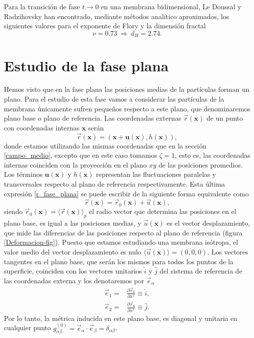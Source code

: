 Para la transición de fase $t\rightarrow 0$ en una membrana bidimensional,
Le Doussal y Radzihovsky \cite{Doussal:nu} han encontrado, mediante métodos analítico aproximados,
los siguientes valores para el exponente de Flory y la dimensión fractal 
\begin{equation*} 
 \nu=0.73\ \Rightarrow\ d_H=2.74 .
\end{equation*}

\section{Estudio de la fase plana}

Hemos visto que en la fase plana las posiciones medias de la partículas forman
un plano. Para el estudio de esta fase vamos a considerar las partículas de la
membrana únicamente sufren pequeños respecto a este plano, que denominaremos
plano base o plano de referencia. Las coordenadas externas
$\vec{r}(\mathbf{x})$ de un punto con coordenadas internas $\mathbf{x}$ serán
\begin{equation}\label{r_fase_plana}
\vec{r}(\mathbf{x})=(\mathbf{x}+\mathbf{u(\mathbf{x})},h(\mathbf{x})),
\end{equation}
donde estamos utilizando las mismas coordenadas que en la sección \ref{campo_medio}, excepto que en
este caso tomamos $\zeta=1$, esto es, las coordenadas internas coinciden con
la proyección en el plano $xy$ de las posiciones promedios. Los términos
$\mathbf{u(\mathbf{x})}$ y $h(\mathbf{x})$ representan las fluctuaciones
paralelas y transversales respecto al plano de
referencia respectivamente. Esta última
expresión \eqref{r_fase_plana} se puede escribir de la siguiente forma
equivalente como
\begin{equation}\label{deformacion}
\vec{r}(\mathbf{x})=\vec{r}_0(\mathbf{x})+\vec{u}(\mathbf{x}),
\end{equation}
siendo $\vec{r}_0(\mathbf{x})=\langle\vec{r}(\mathbf{x}) \rangle_p$ el radio
vector que determina las posiciones en el plano base, es igual a las
posiciones medias, y $\vec{u}(\mathbf{x})$ es el vector desplazamiento, que
mide las diferencias de las posiciones respecto al plano de referencia (figura
\ref{Deformacion-fig}). Puesto
que estamos estudiando una membrana isótropa, el valor medio del
vector desplazamiento es nulo $\langle\vec{u}(\mathbf{x}) \rangle=(0,0,0)$.
Los vectores tangentes en el plano base, que serán los mismos para todos los
puntos de la superficie, coinciden con los vectores unitarios $\hat{i}$ y
$\hat{j}$ del sistema de referencia de las coordenadas externa y los denotaremos por $\vec{e}_\alpha$
\begin{align*}
 \vec{e}_1=&\frac{\partial \vec{r}_0}{\partial x^1}\equiv \hat{i},\\
 \vec{e}_2=&\frac{\partial \vec{r}_0}{\partial x^1}\equiv \hat{j}.
\end{align*}
Por lo tanto, la métrica inducida en
este plano base, es diagonal y unitaria en cualquier punto
$g^{(0)}_{\alpha\beta}=\vec{e}_{\alpha}\cdot\vec{e}_{\beta}
=\delta_{\alpha\beta}$. 

